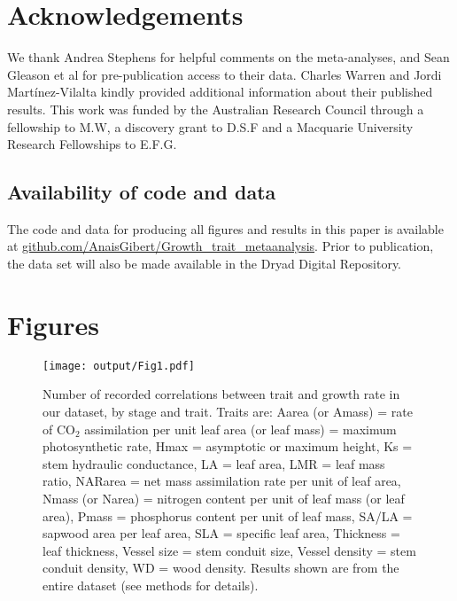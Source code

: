 \documentclass[a4paper,11pt]{article}
\newcommand{\smurl}[1]{\url{#1}}
\begin{document}
\section*{Acknowledgements}\label{Acknowledgment}

We thank Andrea Stephens for helpful comments on the meta-analyses, and Sean Gleason et al for pre-publication access to their data. Charles Warren and Jordi Mart{\'i}nez-Vilalta kindly provided additional information about their published results. This work was funded by the Australian Research Council through a fellowship to M.W, a discovery grant to D.S.F and a Macquarie University Research Fellowships to E.F.G.

\subsection*{Availability of code and data}\label{code}

The code and data for producing all figures and results in this paper is available at \smurl{github.com/AnaisGibert/Growth\_trait\_metaanalysis}. Prior to publication, the data set will also be made available in the Dryad Digital Repository.

\clearpage
\linespread{1}

\label{references}

\clearpage
\section*{Figures}

\begin{figure}[h!]
\centering
\texttt{[image: output/Fig1.pdf]}
\caption{Number of recorded correlations between trait and growth rate in our dataset, by stage and trait. Traits are: Aarea (or Amass) = rate of CO$_{2}$ assimilation per unit leaf area (or leaf mass) = maximum photosynthetic rate, Hmax = asymptotic or maximum height,  Ks = stem hydraulic conductance, LA = leaf area, LMR = leaf mass ratio, NARarea = net mass assimilation rate per unit of leaf area, Nmass (or Narea) = nitrogen content per unit of leaf mass (or leaf area), Pmass = phosphorus content per unit of leaf mass, SA/LA = sapwood area per leaf area, SLA = specific leaf area, Thickness = leaf thickness, Vessel size = stem conduit size, Vessel density = stem conduit density, WD = wood density. Results shown are from the entire dataset (see methods for details).}
\label{fig:fig1}
\end{figure}
\end{document}
